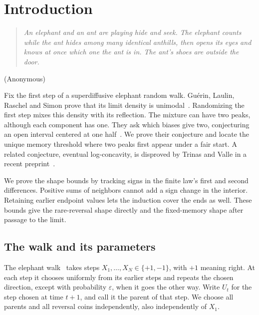 \section{Introduction}\label{sec:intro}

\noindent\begin{minipage}{\linewidth}
\begin{quote}\small\itshape
An elephant and an ant are playing hide and seek. The elephant counts while
the ant hides among many identical anthills, then opens its eyes and knows
at once which one the ant is in. The ant's shoes are outside the door.
\end{quote}
\hfill\textup{(Anonymous)}
\medskip
\end{minipage}

Fix the first step of a superdiffusive elephant random walk.
Gu\'erin, Laulin, Raschel and Simon prove that its limit density is
unimodal~\cite[Theorem~1.1]{glrs2025}. Randomizing the first step mixes
this density with its reflection. The mixture can have two peaks,
although each component has one. They ask which biases give two,
conjecturing an open interval
centered at one half~\cite[Remark~2.1(b)]{glrs2025}.
We prove their conjecture and locate the unique memory threshold
where two peaks first appear under a fair start. A related conjecture,
eventual log-concavity, is disproved by Trinas and Valle in a recent
preprint~\cite{tv2026}.

We prove the shape bounds by tracking signs in the finite law's first
and second differences. Positive sums of neighbors cannot add a sign
change in the interior. Retaining earlier endpoint values lets the
induction cover the ends as well. These bounds give the rare-reversal
shape directly and the fixed-memory shape after passage to the limit.

\subsection{The walk and its parameters}\label{sec:notation}

The elephant walk~\cite{schutz2004} takes steps
$X_1,\dots,X_N\in\{+1,-1\}$, with $+1$ meaning right.
At each step it chooses uniformly from its earlier steps and repeats
the chosen direction, except with probability $\varepsilon$, when it
goes the other way. Write $U_t$ for the step chosen at time $t+1$,
and call it the parent of that step. We choose all parents and all
reversal coins independently, also independently of $X_1$.

